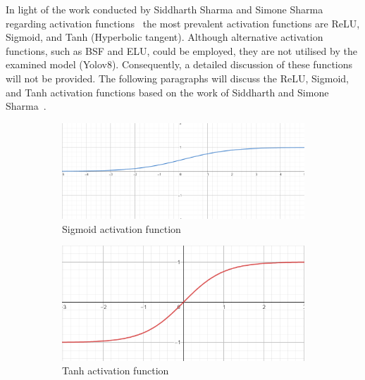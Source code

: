 In light of the work conducted by Siddharth Sharma and Simone Sharma regarding  activation functions~\cite{sharma2017activation}
the most prevalent  activation functions are ReLU, Sigmoid, and Tanh (Hyperbolic tangent).
Although alternative activation functions, such as BSF and ELU, could be employed, they are not utilised by the examined model (Yolov8).
Consequently, a detailed discussion of these functions will not be provided.
The following paragraphs  will discuss the ReLU, Sigmoid, and Tanh activation functions based on the work of Siddharth and Simone Sharma~\cite{sharma2017activation}.


\begin{figure}[h!]
    \centering


    \begin{subfigure}[b]{0.5\textwidth}
        \centering
        \includegraphics[width=\textwidth]{figures/sigmoid}
        \caption{Sigmoid activation function}
        \label{fig:sigmoid}
    \end{subfigure}
    \hfill
    \begin{subfigure}[b]{0.45\textwidth}
        \centering
        \includegraphics[width=\textwidth]{figures/tanh}
        \caption{Tanh activation function}
        \label{fig:tanh}
    \end{subfigure}
    \hfill
    \begin{subfigure}[b]{0.45\textwidth}
        \centering

\end{subfigure}
\end{figure}
